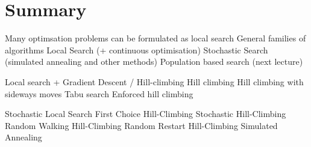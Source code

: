 \documentclass{article}
\begin{document}
\section*{Summary}
\begin{outline}
	\1 Many optimsation problems can be formulated as local search 
	\1 General families of algorithms
		\2 Local Search (+ continuous optimisation)
		\2 Stochastic Search (simulated annealing and other methods)
		\2 Population based search (next lecture)

	\1 Local search + Gradient Descent / Hill-climbing
		\2 Hill climbing
		\2 Hill climbing with sideways moves
		\2 Tabu search
		\2 Enforced hill climbing

	\1 Stochastic Local Search
		\2 First Choice Hill-Climbing
		\2 Stochastic Hill-Climbing
		\2 Random Walking Hill-Climbing
		\2 Random Restart Hill-Climbing
		\2 Simulated Annealing
\end{outline}
\end{document}
